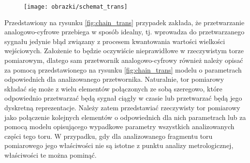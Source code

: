 \begin{figure}[htb!]
\begin{center}
\texttt{[image: obrazki/schemat\_trans]}
\end{center}
\end{figure}

Przedstawiony na rysunku \ref{fig:chain_trans} przypadek zakłada, że przetwarzanie analogowo-cyfrowe przebiega w sposób idealny, tj. wprowadza do przetwarzanego sygnału jedynie błąd związany z procesem kwantowania wartości wielkości wejściowych. Założenie to będzie oczywiście nieprawidłowe w rzeczywistym torze pomiarowym, dlatego sam przetwornik analogowo-cyfrowy również należy opisać za pomocą przedstawionego na rysunku \ref{fig:chain_trans} modelu o parametrach odpowiednich dla analizowanego przetwornika. Naturalnie, tor pomiarowy składać się może z wielu elementów połączonych ze sobą szeregowo, które odpowiednio przetwarzać będą sygnał ciągły w czasie lub przetwarzać będą jego dyskretną reprezentacje. Należy zatem przedstawiać rzeczywisty tor pomiarowy jako połączenie kolejnych elementów o odpowiednich dla nich parametrach lub za pomocą modelu opisującego wypadkowe parametry wszystkich analizowanych części tego toru. W przypadku, gdy dla analizowanego fragmentu toru pomiarowego jego właściwości nie są istotne z punktu analizy metrologicznej, właściwości te można pominąć.

